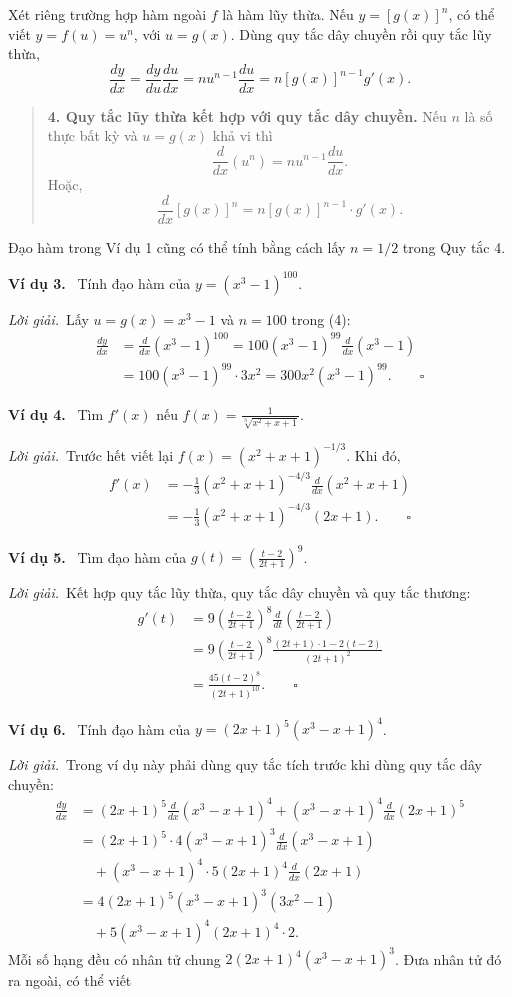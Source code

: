 \documentclass[12pt,a4paper]{article}
\newcommand{\ex}[1]{\par\medskip\noindent\textbf{Ví dụ #1.}\ }
\newcommand{\sol}{\par\nopagebreak[4]\noindent\textit{Lời giải.}\ }
\begin{document}
Xét riêng trường hợp hàm ngoài $f$ là hàm lũy thừa. Nếu $y=[g(x)]^n$, có thể viết $y=f(u)=u^n$, với $u=g(x)$. Dùng quy tắc dây chuyền rồi quy tắc lũy thừa,
\[\frac{dy}{dx}=\frac{dy}{du}\frac{du}{dx}=nu^{n-1}\frac{du}{dx}=n[g(x)]^{n-1}g'(x).\]
\begin{quote}\textbf{4. Quy tắc lũy thừa kết hợp với quy tắc dây chuyền.} Nếu $n$ là số thực bất kỳ và $u=g(x)$ khả vi thì
\[\frac{d}{dx}(u^n)=nu^{n-1}\frac{du}{dx}.\]
Hoặc,
\[\frac{d}{dx}[g(x)]^n=n[g(x)]^{n-1}\cdot g'(x).\]
\end{quote}
Đạo hàm trong Ví dụ 1 cũng có thể tính bằng cách lấy $n=1/2$ trong Quy tắc 4.
\ex{3} Tính đạo hàm của $y=(x^3-1)^{100}$.
\sol Lấy $u=g(x)=x^3-1$ và $n=100$ trong (4):
\begin{align*}
\frac{dy}{dx}&=\frac{d}{dx}(x^3-1)^{100}=100(x^3-1)^{99}\frac{d}{dx}(x^3-1)\\
&=100(x^3-1)^{99}\cdot3x^2=300x^2(x^3-1)^{99}.\qquad\square
\end{align*}
\ex{4} Tìm $f'(x)$ nếu $\displaystyle f(x)=\frac1{\sqrt[3]{x^2+x+1}}$.
\sol Trước hết viết lại $f(x)=(x^2+x+1)^{-1/3}$. Khi đó,
\begin{align*}
f'(x)&=-\frac13(x^2+x+1)^{-4/3}\frac{d}{dx}(x^2+x+1)\\
&=-\frac13(x^2+x+1)^{-4/3}(2x+1).\qquad\square
\end{align*}
\ex{5} Tìm đạo hàm của $\displaystyle g(t)=\left(\frac{t-2}{2t+1}\right)^9$.
\sol Kết hợp quy tắc lũy thừa, quy tắc dây chuyền và quy tắc thương:
\begin{align*}
g'(t)&=9\left(\frac{t-2}{2t+1}\right)^8\frac{d}{dt}\left(\frac{t-2}{2t+1}\right)\\
&=9\left(\frac{t-2}{2t+1}\right)^8\frac{(2t+1)\cdot1-2(t-2)}{(2t+1)^2}\\
&=\frac{45(t-2)^8}{(2t+1)^{10}}.\qquad\square
\end{align*}
\ex{6} Tính đạo hàm của $y=(2x+1)^5(x^3-x+1)^4$.
\sol Trong ví dụ này phải dùng quy tắc tích trước khi dùng quy tắc dây chuyền:
\begin{align*}
\frac{dy}{dx}&=(2x+1)^5\frac{d}{dx}(x^3-x+1)^4+(x^3-x+1)^4\frac{d}{dx}(2x+1)^5\\
&=(2x+1)^5\cdot4(x^3-x+1)^3\frac{d}{dx}(x^3-x+1)\\
&\quad +(x^3-x+1)^4\cdot5(2x+1)^4\frac{d}{dx}(2x+1)\\
&=4(2x+1)^5(x^3-x+1)^3(3x^2-1)\\
&\quad +5(x^3-x+1)^4(2x+1)^4\cdot2.
\end{align*}
Mỗi số hạng đều có nhân tử chung $2(2x+1)^4(x^3-x+1)^3$. Đưa nhân tử đó ra ngoài, có thể viết
\end{document}
